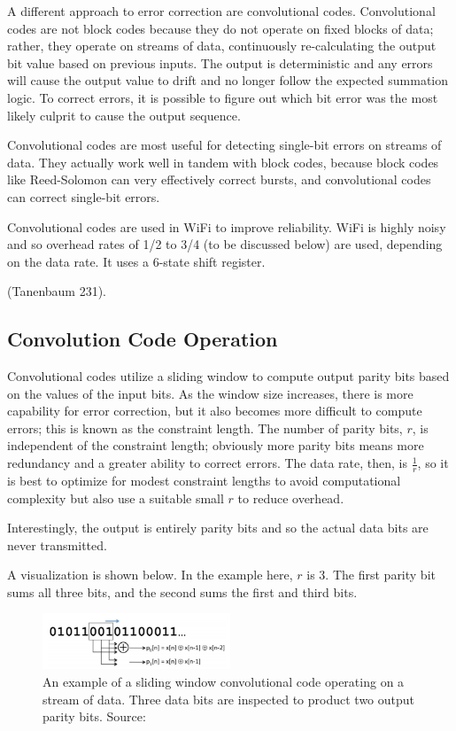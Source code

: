 \documentclass[12pt]{article}
\begin{document}
A different approach to error correction are convolutional codes. Convolutional codes are not block codes because they do not operate on fixed blocks of data; rather, they operate on streams of data, continuously re-calculating the output bit value based on previous inputs. The output is deterministic and any errors will cause the output value to drift and no longer follow the expected summation logic. To correct errors, it is possible to figure out which bit error was the most likely culprit to cause the output sequence.

Convolutional codes are most useful for detecting single-bit errors on streams of data. They actually work well in tandem with block codes, because block codes like Reed-Solomon can very effectively correct bursts, and convolutional codes can correct single-bit errors. 

Convolutional codes are used in WiFi to improve reliability. WiFi is highly noisy and so overhead rates of 1/2 to 3/4 (to be discussed below) are used, depending on the data rate. It uses a 6-state shift register. %

(Tanenbaum 231).

\subsection{Convolution Code Operation}

Convolutional codes utilize a sliding window to compute output parity bits based on the values of the input bits. As the window size increases, there is more capability for error correction, but it also becomes more difficult to compute errors; this is known as the constraint length. The number of parity bits, $r$, is independent of the constraint length; obviously more parity bits means more redundancy and a greater ability to correct errors. The data rate, then, is $\frac{1}{r}$, so it is best to optimize for modest constraint lengths to avoid computational complexity but also use a suitable small $r$ to reduce overhead. 

Interestingly, the output is entirely parity bits and so the actual data bits are never transmitted. 

A visualization is shown below. In the example here, $r$ is 3. The first parity bit sums all three bits, and the second sums the first and third bits.

\begin{figure}[h!]
 \centering
 \includegraphics[width=0.5\textwidth]{img/conv.png}
 \caption{An example of a sliding window convolutional code operating on a stream of data. Three data bits are inspected to product two output parity bits. Source: } 
 \label{fig:conv}
 \end{figure}
\end{document}
